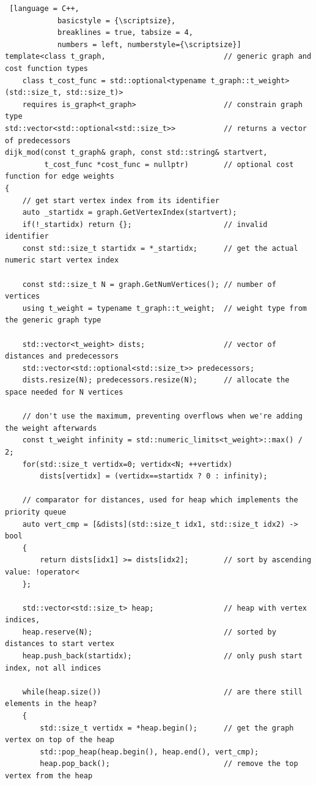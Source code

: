 \begin{listing}[htb]
	\begin{lstlisting} [language = C++,
			basicstyle = {\scriptsize},
			breaklines = true, tabsize = 4,
			numbers = left, numberstyle={\scriptsize}]
template<class t_graph,                           // generic graph and cost function types
	class t_cost_func = std::optional<typename t_graph::t_weight>(std::size_t, std::size_t)>
	requires is_graph<t_graph>                    // constrain graph type
std::vector<std::optional<std::size_t>>           // returns a vector of predecessors
dijk_mod(const t_graph& graph, const std::string& startvert,
         t_cost_func *cost_func = nullptr)        // optional cost function for edge weights
{
	// get start vertex index from its identifier
	auto _startidx = graph.GetVertexIndex(startvert);
	if(!_startidx) return {};                     // invalid identifier
	const std::size_t startidx = *_startidx;      // get the actual numeric start vertex index

	const std::size_t N = graph.GetNumVertices(); // number of vertices
	using t_weight = typename t_graph::t_weight;  // weight type from the generic graph type

	std::vector<t_weight> dists;                  // vector of distances and predecessors
	std::vector<std::optional<std::size_t>> predecessors;
	dists.resize(N); predecessors.resize(N);      // allocate the space needed for N vertices

	// don't use the maximum, preventing overflows when we're adding the weight afterwards
	const t_weight infinity = std::numeric_limits<t_weight>::max() / 2;
	for(std::size_t vertidx=0; vertidx<N; ++vertidx)
		dists[vertidx] = (vertidx==startidx ? 0 : infinity);

	// comparator for distances, used for heap which implements the priority queue
	auto vert_cmp = [&dists](std::size_t idx1, std::size_t idx2) -> bool
	{
		return dists[idx1] >= dists[idx2];        // sort by ascending value: !operator<
	};

	std::vector<std::size_t> heap;                // heap with vertex indices,
	heap.reserve(N);                              // sorted by distances to start vertex
	heap.push_back(startidx);                     // only push start index, not all indices

	while(heap.size())                            // are there still elements in the heap?
	{
		std::size_t vertidx = *heap.begin();      // get the graph vertex on top of the heap
		std::pop_heap(heap.begin(), heap.end(), vert_cmp);
		heap.pop_back();                          // remove the top vertex from the heap


\end{lstlisting}
\end{listing}
